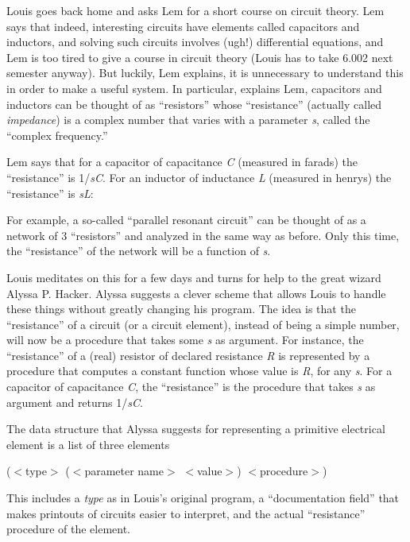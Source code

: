 Louis goes back home and asks Lem for a short course on circuit
theory.  Lem says that indeed, interesting circuits have elements
called capacitors and inductors, and solving such circuits involves
(ugh!) differential equations, and Lem is too tired to
give a course in circuit theory (Louis has to take 6.002 next semester
anyway).  But luckily, Lem explains, it is unnecessary to understand
this in order to make a useful system.  In particular, explains Lem,
capacitors and inductors can be thought of as ``resistors'' whose
``resistance'' (actually called {\it impedance}) is a complex number that
varies with a parameter {\it s}, called the ``complex frequency.''

Lem says that for a capacitor of capacitance {\it C} (measured in farads)
the ``resistance'' is 1/{\it sC}.  For an inductor of inductance {\it L} (measured
in henrys) the ``resistance'' is {\it sL}:


\vspace{2in}

For example, a so-called ``parallel resonant circuit'' can be thought
of as a network of 3 ``resistors'' and analyzed in the same way as
before.  Only this time, the ``resistance'' of the network will be a
function of {\it s}.

\vspace{2in}

Louis meditates on this for a few days and turns for help to the great
wizard Alyssa P. Hacker.  Alyssa suggests a clever scheme that allows
Louis to handle these things without greatly changing his program.
The idea is that the ``resistance'' of a circuit (or a circuit
element), instead of being a simple number,
will now be a procedure that takes some {\it s} as argument.
For instance, the ``resistance'' of a
(real) resistor of declared resistance {\it R} is represented by a
procedure that computes a constant function whose value is {\it R}, for
any {\it s}.  For a capacitor of capacitance {\it C}, the ``resistance''
is the procedure that takes {\it s} as argument and returns 1/{\it sC}.

The data structure that Alyssa suggests for representing a primitive
electrical element is a list of three elements

\beginlisp
($<$type$>$ ($<$parameter name$>$ $<$value$>$) $<$procedure$>$)
\endlisp

This includes a {\it type} as in Louis's original program, a
``documentation field'' that makes printouts of circuits easier to
interpret, and the actual ``resistance'' procedure of the element.

